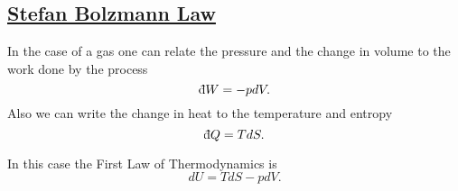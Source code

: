 \subsection{\underline{Stefan Bolzmann Law}}

In the case of a gas one can relate the pressure and the change in volume to the work done by  the process \[ \dbar W = -p dV. \] Also we can write the change in heat to the temperature and entropy \[ \dbar Q = T dS. \]

In this case the First Law of Thermodynamics is \[ dU = T dS - p dV. \]
